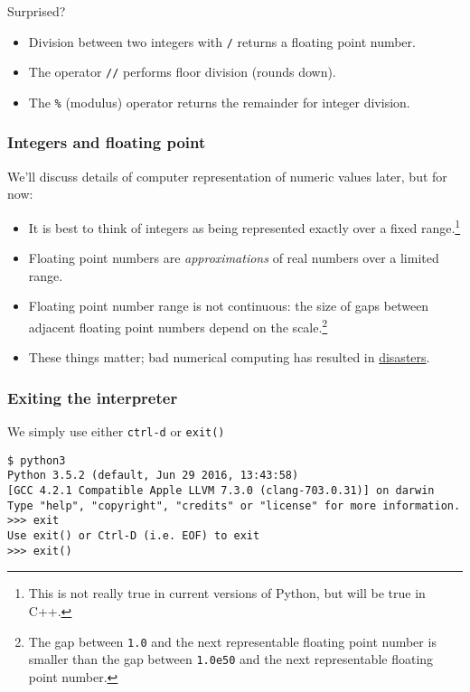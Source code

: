 \documentclass[12pt,letterpaper,twoside]{article}
\begin{document}
Surprised?
\begin{itemize}
\item
  Division between two integers with \texttt{/} returns a floating point
  number.
\item
  The operator \texttt{//} performs floor division (rounds down).
\item
  The \texttt{\%} (modulus) operator
  returns the remainder for integer division.
\end{itemize}

\hypertarget{integers-and-floating-point}{%
\subsubsection{Integers and floating
point}\label{integers-and-floating-point}}

We'll discuss details of computer
representation of numeric values later, but for now:

\begin{itemize}
\item
  It is best to think of integers as being represented exactly over a
  fixed range.\footnote{This is not really true in current versions of Python,
  but will be true in C++.}
\item
  Floating point numbers are \emph{approximations} of real numbers over
  a limited range.
\item
  Floating point number range is not continuous: the size of gaps between
  adjacent floating point numbers depend on the scale.\footnote{The gap between
  \texttt{1.0} and the next representable floating point number is
  smaller than the gap between \texttt{1.0e50} and the next
  representable floating point number.}
\item
  These things matter; bad numerical computing has resulted in \href{https://www.ima.umn.edu/~arnold/disasters/}{disasters}.
\end{itemize}
\vspace{-18pt}
\subsubsection{Exiting the interpreter}
We simply use either \texttt{ctrl-d} or \texttt{exit()}
{
\footnotesize
\begin{verbatim}
$ python3
Python 3.5.2 (default, Jun 29 2016, 13:43:58)
[GCC 4.2.1 Compatible Apple LLVM 7.3.0 (clang-703.0.31)] on darwin
Type "help", "copyright", "credits" or "license" for more information.
>>> exit
Use exit() or Ctrl-D (i.e. EOF) to exit
>>> exit()
\end{verbatim}
}
\vspace{-8pt}
\end{document}
